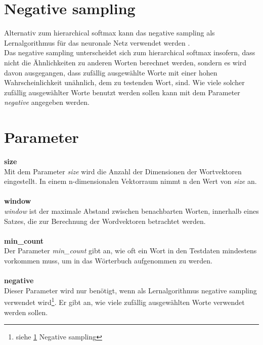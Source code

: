 \documentclass[12pt,a4paper]{report}
\begin{document}
	\section{Negative sampling}
	\label{sec:negativeSampling}
	Alternativ zum hierarchical softmax kann das negative sampling als Lernalgorithmus für das neuronale Netz verwendet werden \citep{DBLP:journals/corr/MikolovSCCD13}.\\
	Das negative sampling unterscheidet sich zum hierarchical softmax insofern, dass nicht die Ähnlichkeiten zu anderen Worten berechnet werden, sondern es wird davon ausgegangen, dass zufällig ausgewählte Worte mit einer hohen Wahrscheinlichkeit unähnlich, dem zu testenden Wort, sind. Wie viele solcher zufällig ausgewählter Worte benutzt werden sollen kann mit dem Parameter \textit{negative} angegeben werden.\\
	
	
	\section{Parameter}
	\label{sec:Parameter}
	\textbf{size}
	\vspace{1em}\\
	Mit dem Parameter \textit{size} wird die Anzahl der Dimensionen der Wortvektoren eingestellt. In einem n-dimensionalen Vektorraum nimmt n den Wert von \textit{size} an.\\	
	\vspace{1em}\\
	\textbf{window}
	\vspace{1em}\\
	\textit{window} ist der maximale Abstand zwischen benachbarten Worten, innerhalb eines Satzes, die zur Berechnung der Wordvektoren betrachtet werden.\\
	\vspace{1em}\\
	\textbf{min\_count}
	\vspace{1em}\\
	Der Parameter \textit{min\_count} gibt an, wie oft ein Wort in den Testdaten mindestens vorkommen muss, um in das Wörterbuch aufgenommen zu werden.\\
	\vspace{1em}\\
	\textbf{negative}
	\vspace{1em}\\
	Dieser Parameter wird nur benötigt, wenn als Lernalgorithmus negative sampling verwendet wird\footnote{siehe \ref{sec:negativeSampling} Negative sampling}. Er gibt an, wie viele zufällig ausgewählten Worte verwendet werden sollen.
	
\end{document}
